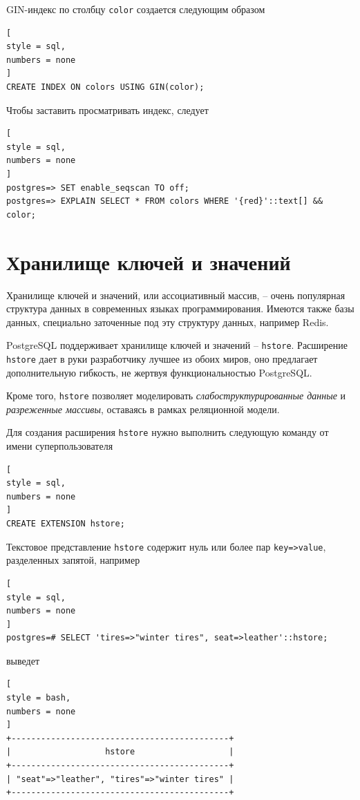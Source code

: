\documentclass[%
	11pt,
	a4paper,
	utf8,
		]{article}
\begin{document}
GIN-индекс по столбцу \texttt{color} создается следующим образом
\begin{lstlisting}[
style = sql,
numbers = none
]
CREATE INDEX ON colors USING GIN(color);
\end{lstlisting}

Чтобы заставить просматривать индекс, следует
\begin{lstlisting}[
style = sql,
numbers = none
]
postgres=> SET enable_seqscan TO off;
postgres=> EXPLAIN SELECT * FROM colors WHERE '{red}'::text[] && color;
\end{lstlisting}

\section{Хранилище ключей и значений}

Хранилище ключей и значений, или ассоциативный массив, -- очень популярная структура данных в современных языках программирования. Имеются также базы данных, специально заточенные под эту структуру данных, например Redis.

PostgreSQL поддерживает хранилище ключей и значений -- \texttt{hstore}. Расширение \texttt{hstore} дает в руки разработчику лучшее из обоих миров, оно предлагает дополнительную гибкость, не жертвуя функциональностью PostgreSQL.

Кроме того, \texttt{hstore} позволяет моделировать \emph{слабоструктурированные данные} и \emph{разреженные массивы}, оставаясь в рамках реляционной модели.

Для создания расширения \texttt{hstore} нужно выполнить следующую команду от имени суперпользователя
\begin{lstlisting}[
style = sql,
numbers = none
]
CREATE EXTENSION hstore;
\end{lstlisting}

Текстовое представление \texttt{hstore} содержит нуль или более пар \texttt{key=>value}, разделенных запятой, например
\begin{lstlisting}[
style = sql,
numbers = none
]
postgres=# SELECT 'tires=>"winter tires", seat=>leather'::hstore;
\end{lstlisting}
выведет
\begin{lstlisting}[
style = bash,
numbers = none
]
+--------------------------------------------+
|                   hstore                   |
+--------------------------------------------+
| "seat"=>"leather", "tires"=>"winter tires" |
+--------------------------------------------+
\end{lstlisting}
\end{document}
